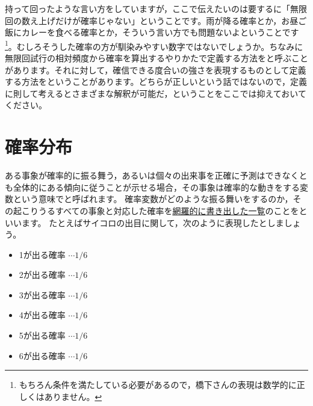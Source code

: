 \documentclass{ltjbook}
\begin{document}
持って回ったような言い方をしていますが，ここで伝えたいのは要するに「無限回の数え上げだけが確率じゃない」ということです。雨が降る確率とか，お昼ご飯にカレーを食べる確率とか，そういう言い方でも問題ないよということです\footnote{もちろん条件を満たしている必要があるので，橋下さんの表現は数学的に正しくはありません。}。むしろそうした確率の方が馴染みやすい数字ではないでしょうか。ちなみに無限回試行の相対頻度から確率を算出するやりかたで定義する方法をと呼ぶことがあります。それに対して，確信できる度合いの強さを表現するものとして定義する方法をということがあります。どちらが正しいという話ではないので，定義に則して考えるとさまざまな解釈が可能だ，ということをここでは抑えておいてください。

\section{確率分布}
ある事象が確率的に振る舞う，あるいは個々の出来事を正確に予測はできなくとも全体的にある傾向に従うことが示せる場合，その事象は確率的な動きをする変数という意味でと呼ばれます。
確率変数がどのような振る舞いをするのか，その起こりうるすべての事象と対応した確率を\underline{網羅的に書き出した一覧}のことをといいます。
たとえばサイコロの出目に関して，次のように表現したとしましょう。
\begin{itemize}
	\item 1が出る確率 $\cdots 1/6$
	\item 2が出る確率 $\cdots 1/6$
	\item 3が出る確率 $\cdots 1/6$
	\item 4が出る確率 $\cdots 1/6$
	\item 5が出る確率 $\cdots 1/6$
	\item 6が出る確率 $\cdots 1/6$
\end{itemize}
\end{document}

